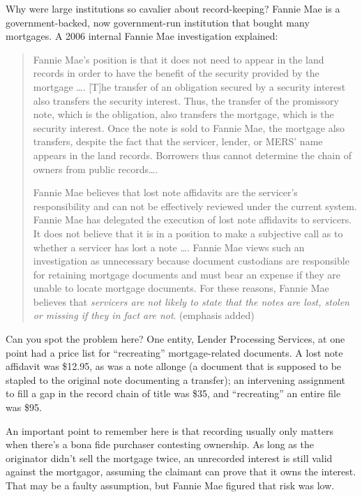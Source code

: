\item Why were large institutions so cavalier about record-keeping? Fannie Mae
is a government-backed, now government-run institution that bought many
mortgages. A 2006 internal Fannie Mae investigation explained: 
\begin{quotation}
Fannie Mae's position is that it does not need to appear in the land records in
order to have the benefit of the security provided by the mortgage \dots .
[T]he transfer of an obligation secured by a security interest also transfers
the security interest. Thus, the transfer of the promissory note, which is the
obligation, also transfers the mortgage, which is the security interest. Once
the note is sold to Fannie Mae, the mortgage also transfers, despite the fact
that the servicer, lender, or MERS' name appears in the land records. Borrowers
thus cannot determine the chain of owners from public records\dots.

Fannie Mae believes that lost note affidavits are the servicer's responsibility
and can not be effectively reviewed under the current system. Fannie Mae has
delegated the execution of lost note affidavits to servicers. It does not
believe that it is in a position to make a subjective call as to whether a
servicer has lost a note \dots . Fannie Mae views such an investigation as
unnecessary because document custodians are responsible for retaining
mortgage documents and must bear an expense if they are unable to locate
mortgage documents. For these reasons, Fannie Mae believes that
\textit{servicers are not likely to state that the notes are lost, stolen or
missing if they in fact are not}. (emphasis added) 
\end{quotation}
Can you spot the problem here? One entity, Lender Processing Services, at one
point had a price list for ``recreating'' mortgage-related documents. A lost
note affidavit was \$12.95, as was a note allonge (a document that is supposed
to be stapled to the original note documenting a transfer); an intervening
assignment to fill a gap in the record chain of title was \$35, and
``recreating'' an entire file was \$95.



An important point to remember here is that recording usually only matters when
there's a bona fide purchaser contesting ownership. As long as the originator
didn't sell the mortgage twice, an unrecorded interest is still valid against
the mortgagor, assuming the claimant can prove that it owns the interest. That
may be a faulty assumption, but Fannie Mae figured that risk was low.



